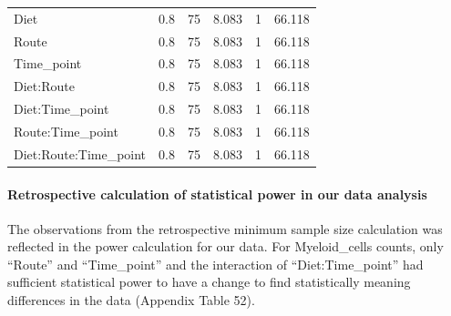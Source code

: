 \documentclass[
  12pt,
  letterpaper,
]{article}
\begin{document}
\begin{longtable}{l|rrrrr}
\midrule\addlinespace[2.5pt]
Diet & 0.8 & 75 & 8.083 & 1 & 66.118 \\ 
Route & 0.8 & 75 & 8.083 & 1 & 66.118 \\ 
Time\_point & 0.8 & 75 & 8.083 & 1 & 66.118 \\ 
Diet:Route & 0.8 & 75 & 8.083 & 1 & 66.118 \\ 
Diet:Time\_point & 0.8 & 75 & 8.083 & 1 & 66.118 \\ 
Route:Time\_point & 0.8 & 75 & 8.083 & 1 & 66.118 \\ 
Diet:Route:Time\_point & 0.8 & 75 & 8.083 & 1 & 66.118 \\ 
\bottomrule
\end{longtable}

\paragraph{Retrospective calculation of statistical power in our data analysis}\label{retrospective-calculation-of-statistical-power-in-our-data-analysis-1}

The observations from the retrospective minimum sample size calculation was reflected in the power calculation for our data. For Myeloid\_cells counts, only ``Route'' and ``Time\_point'' and the interaction of ``Diet:Time\_point'' had sufficient statistical power to have a change to find statistically meaning differences in the data (Appendix Table 52).
\end{document}
